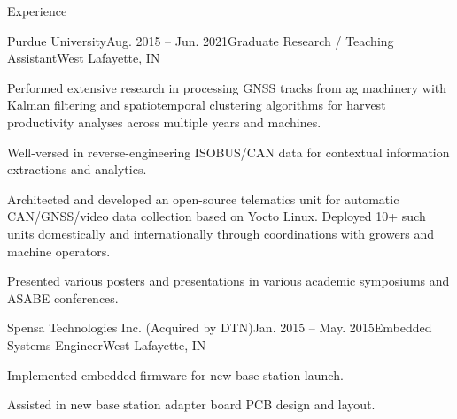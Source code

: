 \documentclass{resume}
\begin{document}
\begin{rSection}{Experience}
    \begin{rSubsection}{Purdue University}{Aug. 2015 -- Jun. 2021}{Graduate
        Research / Teaching Assistant}{West Lafayette, IN}
      \item Performed extensive research in processing GNSS tracks from ag
      machinery with Kalman filtering and spatiotemporal clustering algorithms
      for harvest productivity analyses across multiple years and machines.
      \item Well-versed in reverse-engineering ISOBUS/CAN data for
      contextual information extractions and analytics.
      \item Architected and developed an open-source telematics unit for
      automatic CAN/GNSS/video data collection based on Yocto Linux. Deployed
      10+ such units domestically and internationally through coordinations with
      growers and machine operators.
      \item Presented various posters and presentations in various academic
      symposiums and ASABE conferences.
    \end{rSubsection}

    \begin{rSubsection}{Spensa Technologies Inc. (Acquired by DTN)}{Jan. 2015 --
      May. 2015}{Embedded Systems Engineer}{West Lafayette, IN}
      \item Implemented embedded firmware for new base station launch.
      \item Assisted in new base station adapter board PCB design and layout. 
    \end{rSubsection}

%
  \end{rSection}
  
\end{document}
